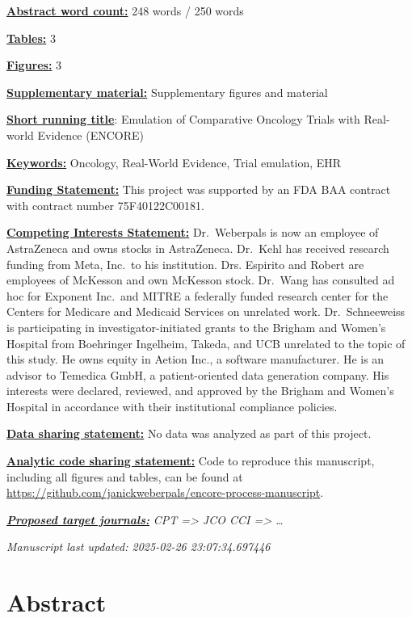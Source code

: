 \documentclass[
  letterpaper,
  DIV=11,
  numbers=noendperiod]{scrartcl}
\begin{document}
\ul{\textbf{Abstract word count:}} 248 words / 250 words

\ul{\textbf{Tables:}} 3

\ul{\textbf{Figures:}} 3

\ul{\textbf{Supplementary material:}} Supplementary figures and material

\ul{\textbf{Short running title}}: Emulation of Comparative Oncology
Trials with Real-world Evidence (ENCORE)

\ul{\textbf{Keywords:}} Oncology, Real-World Evidence, Trial emulation,
EHR

\ul{\textbf{Funding Statement:}} This project was supported by an FDA
BAA contract with contract number 75F40122C00181.

\ul{\textbf{Competing Interests Statement:}} Dr.~Weberpals is now an
employee of AstraZeneca and owns stocks in AstraZeneca. Dr.~Kehl has
received research funding from Meta, Inc.~to his institution. Drs.
Espirito and Robert are employees of McKesson and own McKesson stock.
Dr.~Wang has consulted ad hoc for Exponent Inc.~and MITRE a federally
funded research center for the Centers for Medicare and Medicaid
Services on unrelated work. Dr.~Schneeweiss is participating in
investigator-initiated grants to the Brigham and Women's Hospital from
Boehringer Ingelheim, Takeda, and UCB unrelated to the topic of this
study. He owns equity in Aetion Inc., a software manufacturer. He is an
advisor to Temedica GmbH, a patient-oriented data generation company.
His interests were declared, reviewed, and approved by the Brigham and
Women's Hospital in accordance with their institutional compliance
policies.

\ul{\textbf{Data sharing statement:}} No data was analyzed as part of
this project.

\ul{\textbf{Analytic code sharing statement:}} Code to reproduce this
manuscript, including all figures and tables, can be found at
\url{https://github.com/janickweberpals/encore-process-manuscript}.

\ul{\textbf{\emph{Proposed target journals:}}} \emph{CPT =\textgreater{}
JCO CCI =\textgreater{} \ldots{}}

\emph{Manuscript last updated: 2025-02-26 23:07:34.697446}

\newpage{}

\section*{Abstract}\label{abstract}
\end{document}

